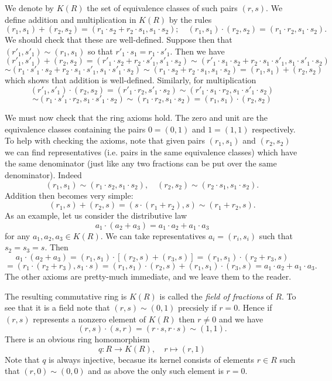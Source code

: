 \documentclass [12pt,oneside,a4paper,mathscr]{amsart}
\theoremstyle{definition}
\begin{document}
We denote by $K(R)$ the set of equivalence classes of such pairs $(r,s)$. 
We define addition and multiplication in $K(R)$ by the rules
\[(r_1,s_1) + (r_2,s_2)=(r_1\cdot s_2+r_2\cdot s_1,s_1\cdot s_2); \quad (r_1,s_1) \cdot (r_2,s_2)=(r_1 \cdot r_2, s_1\cdot  s_2).\]
We should check that these are well-defined. Suppose then that $(r'_1,s'_1)\sim (r_1,s_1)$ so that $r'_1 \cdot s_1=r_1 \cdot s'_1$. Then we have
\[(r'_1,s'_1)+(r_2,s_2)=(r'_1 \cdot  s_2+ r_2  \cdot s'_1 ,s'_1  \cdot s_2)\sim (r'_1  \cdot s_1 \cdot  s_2 + r_2 \cdot  s_1  \cdot s'_1, s_1  \cdot s'_1 \cdot  s_2) \]\[\sim (r_1 \cdot  s'_1 \cdot  s_2+ r_2  \cdot s_1 \cdot  s'_1, s_1 \cdot  s'_1  \cdot s_2)\sim (r_1  \cdot s_2 + r_2  \cdot s_1, s_1 \cdot  s_2)=(r_1,s_1)+(r_2,s_2)\]
which shows that addition is well-defined. Similarly, for multiplication
\[(r'_1,s'_1)\cdot(r_2,s_2)=(r'_1 \cdot  r_2  ,s'_1  \cdot s_2)\sim (r'_1   \cdot s_1  \cdot r_2, s_1 \cdot  s'_1  \cdot s_2) \]\[\sim (r_1  \cdot  s'_1 \cdot  r_2, s_1  \cdot s'_1 \cdot  s_2)\sim (r_1 \cdot   r_2 , s_1  \cdot s_2)=(r_1,s_1)\cdot(r_2,s_2)\]

We must now check that the ring axioms hold. The zero and unit are the equivalence classes containing the pairs $0=(0,1)$ and $1=(1,1)$ respectively. To help with checking the axioms,
note that given pairs $(r_1,s_1)$ and $(r_2,s_2)$ we can find representatives (i.e. pairs in the same equivalence classes) which have the same denominator (just like any two fractions can be put over the same denominator). Indeed
\[(r_1,s_1) \sim (r_1  \cdot s_2, s_1 \cdot  s_2),  \quad (r_2,s_2)\sim (r_2 \cdot  s_1, s_1  \cdot s_2).\]
 Addition then becomes very simple:
\[(r_1,s)+(r_2,s)=(s \cdot (r_1+r_2),s)\sim (r_1+r_2,s).\]
As an example, let us consider the distributive law
\[a_1 \cdot (a_2+a_3)=a_1 \cdot a_2+a_1 \cdot a_3\]
for any $a_1,a_2,a_3\in K(R)$. We can take representatives $a_i=(r_i,s_i)$ such that $s_2=s_3=s$. Then
\[a_1 \cdot (a_2+a_3)=(r_1,s_1)\cdot[ (r_2,s)+(r_3,s)]=(r_1,s_1)\cdot(r_2+r_3,s)\]\[=(r_1 \cdot  (r_2+ r_3), s_1 \cdot  s)=(r_1,s_1) \cdot (r_2,s)+(r_1,s_1) \cdot (r_3,s)=a_1  \cdot a_2+a_1  \cdot a_3.\]
The other axioms are pretty-much immediate, and we leave them to the reader.


The resulting commutative ring is $K(R)$ is called the \emph{field of fractions} of $R$. To see that it is a field note that $(r,s)\sim (0,1)$ precsiely if $r=0$. Hence if $(r,s)$ represents a nonzero element of $K(R)$ then $r\neq 0$ and we have
\[(r,s)\cdot (s,r) = (r \cdot s,r \cdot s)\sim (1,1).\]
There is an obvious  ring homomorphism
\[q\colon R \to K(R), \quad r\mapsto (r,1)\]
 Note that $q$ is always injective, becasue its kernel consists of elements $r\in R$ such that $(r,0)\sim (0,0)$ and as above the only such element is $r=0$. 
\end{document}
